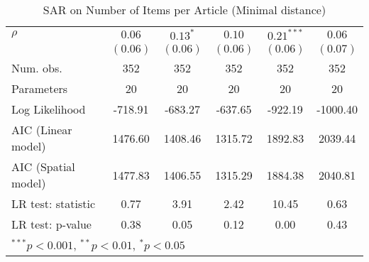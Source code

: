 \begin{table}[!h]
\begin{center}
\begin{tabular}{l c c c c c }
$\rho$                  & $0.06$       & $0.13^{*}$   & $0.10$       & $0.21^{***}$ & $0.06$       \\
                        & $(0.06)$     & $(0.06)$     & $(0.06)$     & $(0.06)$     & $(0.07)$     \\
\midrule
Num. obs.               & 352          & 352          & 352          & 352          & 352          \\
Parameters              & 20           & 20           & 20           & 20           & 20           \\
Log Likelihood          & -718.91      & -683.27      & -637.65      & -922.19      & -1000.40     \\
AIC (Linear model)      & 1476.60      & 1408.46      & 1315.72      & 1892.83      & 2039.44      \\
AIC (Spatial model)     & 1477.83      & 1406.55      & 1315.29      & 1884.38      & 2040.81      \\
LR test: statistic      & 0.77         & 3.91         & 2.42         & 10.45        & 0.63         \\
LR test: p-value        & 0.38         & 0.05         & 0.12         & 0.00         & 0.43         \\
\bottomrule
\multicolumn{6}{l}{\scriptsize{$^{***}p<0.001$, $^{**}p<0.01$, $^*p<0.05$}}
\end{tabular}
\caption{SAR on Number of Items per Article (Minimal distance)}
\label{table:coefficients}
\end{center}
\end{table}
